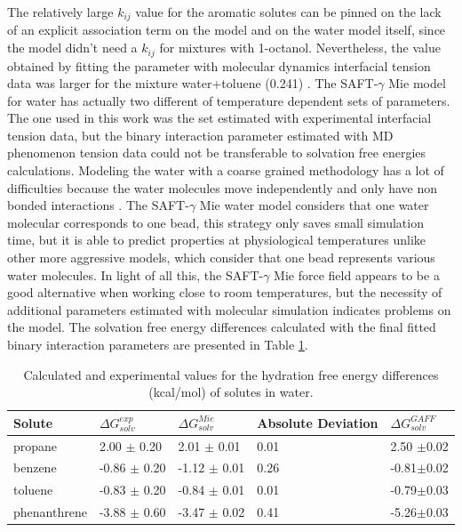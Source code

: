 The relatively large $k_{ij}$ value for the aromatic solutes can be pinned on the lack of an explicit association term on the model and on the water model itself, since the model didn't need a $k_{ij}$ for mixtures with 1-octanol. Nevertheless, the value obtained by fitting the parameter with molecular dynamics interfacial tension data was larger for the mixture water+toluene (0.241) \cite{herdes2017}.  The SAFT-$\gamma$ Mie model for water \cite{lobanova2016} has actually two different of temperature dependent sets of parameters. The one used in this work was the set estimated with experimental interfacial tension data, but the binary interaction parameter estimated with MD phenomenon tension data could not be transferable to solvation free energies calculations. Modeling the water with a coarse grained methodology has a lot of difficulties because the water molecules move independently and only have non bonded interactions \cite{hadley2010,hadley2012}. The  SAFT-$\gamma$ Mie water model considers that one water molecular corresponds to one bead, this strategy only saves small simulation time, but it is able to predict properties at physiological temperatures unlike other more aggressive models, which consider that one bead represents various water molecules. In light of all this, the SAFT-$\gamma$ Mie force field appears to be a good alternative when working close to room temperatures, but the necessity of additional parameters estimated with molecular simulation indicates problems on the model. The solvation free energy differences calculated with the final fitted binary interaction parameters are presented in Table \ref{tbl:solv2}.  

\begin{table}[H]
  \centering
  \caption{Calculated and experimental values for the hydration free energy differences  (kcal/mol) of solutes in water.}
  \label{tbl:solv2}
  \begin{tabular}{lllll}
    \hline
     Solute      & $\Delta G_{solv}^{exp}$ & $\Delta G_{solv}^{Mie}$ & Absolute Deviation & $\Delta G_{solv}^{GAFF}$ \\
    \hline
    propane      &  2.00 $\pm$ 0.20 & 2.01 $\pm$ 0.01& 0.01 &2.50 $\pm$0.02 \\
    benzene      & -0.86 $\pm$ 0.20 & -1.12 $\pm$ 0.01    &  0.26    &-0.81$\pm$0.02 \\  
    toluene      & -0.83 $\pm$ 0.20 & -0.84 $\pm$ 0.01   &  0.01    &-0.79$\pm$0.03\\
    phenanthrene & -3.88 $\pm$ 0.60 & -3.47 $\pm$ 0.02& 0.41 &-5.26$\pm$0.03 \\
    \hline
  \end{tabular}

\end{table}

